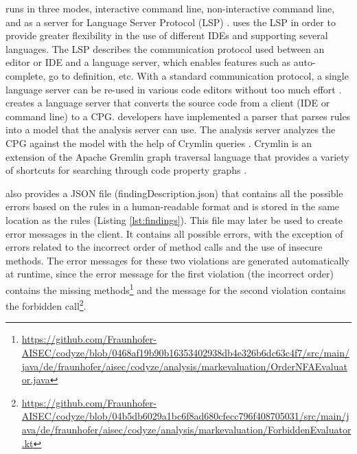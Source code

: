 \codyze{} runs in three modes, interactive command line, non-interactive command line, and as a server for Language Server Protocol (LSP) \cite{lsp}. \codyze{} uses the LSP in order to provide greater flexibility in the use of different IDEs and supporting several languages. The LSP describes the communication protocol used between an editor or IDE and a language server, which enables features such as auto-complete, go to definition, etc. With a standard communication protocol, a single language server can be re-used in various code editors without too much effort \cite{lsp}. \codyze{} creates a language server that converts the source code from a client (IDE or command line) to a CPG. \codyze{} developers have implemented a parser that parses \MARK{} rules into a model that the analysis server can use. The analysis server analyzes the CPG against the \MARK{} model with the help of Crymlin queries \cite{gremlin}. Crymlin is an extension of the Apache Gremlin graph traversal language that provides a variety of shortcuts for searching through code property graphs \cite{gremlin}. 


\codyze{} also provides a JSON file (findingDescription.json) that contains all the possible errors based on the \MARK{} rules in a human-readable format and is stored in the same location as the \MARK{} rules (Listing \ref{lst:findings}). This file may later be used to create error messages in the client. It contains all possible errors, with the exception of errors related to the incorrect order of method calls and the use of insecure methods. The error messages for these two violations are generated automatically at runtime, since the error message for the first violation (the incorrect order) contains the missing methods\footnote{\url{https://github.com/Fraunhofer-AISEC/codyze/blob/0468af19b90b16353402938db4e326b6dc63c4f7/src/main/java/de/fraunhofer/aisec/codyze/analysis/markevaluation/OrderNFAEvaluator.java}} and the message for the second violation contains the forbidden call\footnote{\url{https://github.com/Fraunhofer-AISEC/codyze/blob/04b5db6029a1bc6f8ad680cfecc796f408705031/src/main/java/de/fraunhofer/aisec/codyze/analysis/markevaluation/ForbiddenEvaluator.kt}}.

